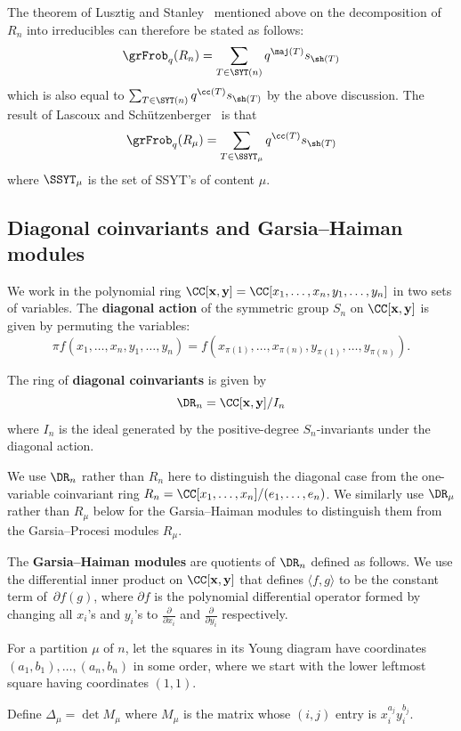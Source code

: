 The theorem of Lusztig and Stanley~\cite{Stanley} mentioned above on the decomposition of~$R_n$ into irreducibles can therefore be stated as follows:
$$\grFrob_q(R_n)=\sum_{T\in \SYT(n)} q^{\maj(T)}s_{\sh(T)}$$
which is also equal to $\sum_{T\in \SYT(n)} q^{\cc(T)}s_{\sh(T)}$ by the above discussion. The result of Lascoux and Sch\"utzenberger~\cite{LascouxSchutzenberger} is that $$\grFrob_q(R_\mu)=\sum_{T\in \SSYT_\mu} q^{\cc(T)}s_{\sh(T)}$$ where $\SSYT_\mu$ is the set of SSYT's of content $\mu$.  

\subsection{Diagonal coinvariants and Garsia--Haiman modules}\label{sec:GH}

We work in the polynomial ring $\CC[{\bf x}, {\bf y}]=\CC[x_1,\ldots,x_n,y_1,\ldots,y_n]$ in two sets of variables.  The \textbf{diagonal action} of the symmetric group $S_n$ on $\CC[\bf x,\bf y]$ is given by permuting the variables: $$\pi f(x_1,\ldots,x_n,y_1,\ldots,y_n)=f(x_{\pi(1)},\ldots,x_{\pi(n)},y_{\pi(1)},\ldots, y_{\pi(n)}).$$

\begin{definition}
	The ring of \textbf{diagonal coinvariants} is given by $$\DR_n=\CC[{\bf x}, {\bf y}]/I_n$$ where $I_n$ is the ideal generated by the positive-degree $S_n$-invariants under the diagonal action.
\end{definition}

\begin{remark}
	We use $\DR_n$ rather than $R_n$ here to distinguish the diagonal case from the one-variable coinvariant ring $R_n=\CC[x_1,\ldots,x_n]/(e_1,\ldots,e_n)$.  We similarly use $\DR_\mu$ rather than $R_\mu$ below for the Garsia--Haiman modules to distinguish them from the Garsia--Procesi modules $R_\mu$.  
\end{remark}

The \textbf{Garsia--Haiman modules} are quotients of $\DR_n$ defined as follows.  We use the differential inner product on $\CC[\mathbf{x},\mathbf{y}]$ that defines $\langle f, g \rangle$ to be the constant term of~$\partial f(g)$, where $\partial f$ is the polynomial differential operator formed by changing all $x_i$'s and $y_i$'s to $\frac{\partial}{\partial x_i}$ and $\frac{\partial}{\partial y_i}$ respectively.



\begin{definition}
	For a partition $\mu$ of $n$, let the squares in its Young diagram have coordinates $(a_1,b_1),\ldots,(a_n,b_n)$ in some order, where we start with the lower leftmost square having coordinates $(1,1)$. 
	
	Define $\Delta_\mu=\det M_\mu$ where $M_\mu$ is the matrix whose $(i,j)$ entry is $x_i^{a_j}y_i^{b_j}$.
\end{definition}

